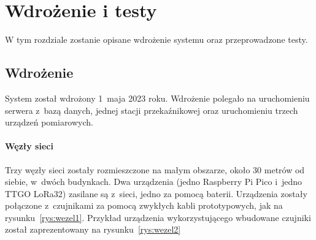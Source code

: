 \chapter{Wdrożenie i testy}
W tym rozdziale zostanie opisane wdrożenie systemu oraz przeprowadzone testy.
\section{Wdrożenie}
System został wdrożony 1~maja 2023 roku.
Wdrożenie polegało na uruchomieniu serwera z~bazą danych, jednej stacji przekaźnikowej oraz uruchomieniu trzech urządzeń pomiarowych.

\subsubsection{Węzły sieci}

Trzy węzły sieci zostały rozmieszczone na małym obszarze, około 30 metrów od siebie, w~dwóch budynkach.
Dwa urządzenia (jedno Raspberry Pi Pico i~jedno TTGO LoRa32) zasilane są z~sieci, jedno za pomocą baterii.
Urządzenia zostały połączone z~czujnikami za pomocą zwykłych kabli prototypowych, jak na rysunku~\ref{rys:wezel1}. %
Przykład urządzenia wykorzystującego wbudowane czujniki został zaprezentowany na rysunku~\ref{rys:wezel2}

